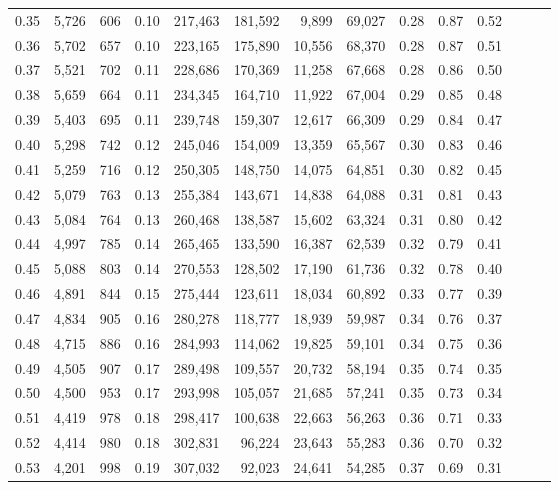 \begin{tabular}{rrrrrrrrrrrrrr}
0.35 &  5,726 &    606 &  0.10 &  217,463 &  181,592 &   9,899 &  69,027 &  0.28 &  0.87 &      0.52 \\
0.36 &  5,702 &    657 &  0.10 &  223,165 &  175,890 &  10,556 &  68,370 &  0.28 &  0.87 &      0.51 \\
0.37 &  5,521 &    702 &  0.11 &  228,686 &  170,369 &  11,258 &  67,668 &  0.28 &  0.86 &      0.50 \\
0.38 &  5,659 &    664 &  0.11 &  234,345 &  164,710 &  11,922 &  67,004 &  0.29 &  0.85 &      0.48 \\
0.39 &  5,403 &    695 &  0.11 &  239,748 &  159,307 &  12,617 &  66,309 &  0.29 &  0.84 &      0.47 \\
0.40 &  5,298 &    742 &  0.12 &  245,046 &  154,009 &  13,359 &  65,567 &  0.30 &  0.83 &      0.46 \\
0.41 &  5,259 &    716 &  0.12 &  250,305 &  148,750 &  14,075 &  64,851 &  0.30 &  0.82 &      0.45 \\
0.42 &  5,079 &    763 &  0.13 &  255,384 &  143,671 &  14,838 &  64,088 &  0.31 &  0.81 &      0.43 \\
0.43 &  5,084 &    764 &  0.13 &  260,468 &  138,587 &  15,602 &  63,324 &  0.31 &  0.80 &      0.42 \\
0.44 &  4,997 &    785 &  0.14 &  265,465 &  133,590 &  16,387 &  62,539 &  0.32 &  0.79 &      0.41 \\
0.45 &  5,088 &    803 &  0.14 &  270,553 &  128,502 &  17,190 &  61,736 &  0.32 &  0.78 &      0.40 \\
0.46 &  4,891 &    844 &  0.15 &  275,444 &  123,611 &  18,034 &  60,892 &  0.33 &  0.77 &      0.39 \\
0.47 &  4,834 &    905 &  0.16 &  280,278 &  118,777 &  18,939 &  59,987 &  0.34 &  0.76 &      0.37 \\
0.48 &  4,715 &    886 &  0.16 &  284,993 &  114,062 &  19,825 &  59,101 &  0.34 &  0.75 &      0.36 \\
0.49 &  4,505 &    907 &  0.17 &  289,498 &  109,557 &  20,732 &  58,194 &  0.35 &  0.74 &      0.35 \\
0.50 &  4,500 &    953 &  0.17 &  293,998 &  105,057 &  21,685 &  57,241 &  0.35 &  0.73 &      0.34 \\
0.51 &  4,419 &    978 &  0.18 &  298,417 &  100,638 &  22,663 &  56,263 &  0.36 &  0.71 &      0.33 \\
0.52 &  4,414 &    980 &  0.18 &  302,831 &   96,224 &  23,643 &  55,283 &  0.36 &  0.70 &      0.32 \\
0.53 &  4,201 &    998 &  0.19 &  307,032 &   92,023 &  24,641 &  54,285 &  0.37 &  0.69 &      0.31 \\

\end{tabular}
